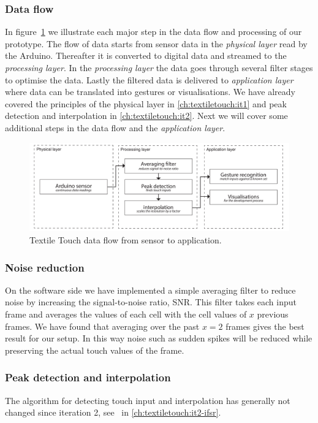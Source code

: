 \subsubsection{Data flow}
In figure~\ref{fig:textiletouch:dataflow} we illustrate each major step in the data flow and processing 
of our prototype.
The flow of data starts from sensor data in the \emph{physical layer} read by the Arduino.
Thereafter it is converted to digital data and streamed to the \emph{processing layer}.
In the \emph{processing layer} the data goes through several filter stages to optimise the data.
Lastly the filtered data is delivered to \emph{application layer} where data can be translated into gestures or visualisations.
We have already covered the principles of the physical layer in \ref{ch:textiletouch:it1} and peak detection and interpolation in \ref{ch:textiletouch:it2}.
Next we will cover some additional steps in the data flow and the \emph{application layer}.

\begin{figure}[b]
  \centering
      \includegraphics[width=\textwidth]{figures/touch/dataflow}
  \caption[The data flow from sensor to application.]
   {Textile Touch data flow from sensor to application.}
   \label{fig:textiletouch:dataflow}
\end{figure}

\subsubsection{Noise reduction}
On the software side we have implemented a simple averaging filter to reduce noise by increasing the signal-to-noise ratio, SNR.
This filter takes each input frame and averages the values of each cell with the cell values of \(x\) previous frames.
We have found that averaging over the past \(x = 2\) frames gives the best result for our setup. 
In this way noise such as sudden spikes will be reduced while preserving the actual touch values of the frame.

\subsubsection{Peak detection and interpolation}
The algorithm for detecting touch input and interpolation has generally not changed since iteration 2, see~ in \ref{ch:textiletouch:it2-ifsr}.


